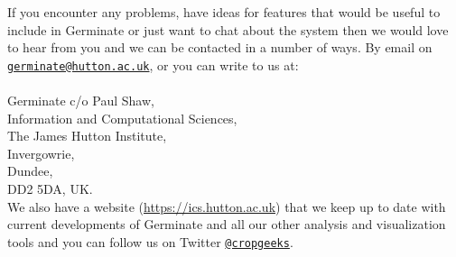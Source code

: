 If you encounter any problems, have ideas for features that would be useful to include in Germinate or just want to chat about the system then we would love to hear from you and we can be contacted in a number of ways. By email on \href{mailto:germinate@hutton.ac.uk}{\nolinkurl{germinate@hutton.ac.uk}}, or you can write to us at: \\
\\
Germinate c/o Paul Shaw,\\ 
Information and Computational Sciences, \\
The James Hutton Institute, \\
Invergowrie, \\
Dundee, \\
DD2 5DA, UK. \\

\noindent
We also have a website (\url{https://ics.hutton.ac.uk}) that we keep up to date with current developments of Germinate and all our other analysis and visualization tools and you can follow us on Twitter \href{https://twitter.com/cropgeeks}{\nolinkurl{@cropgeeks}}.